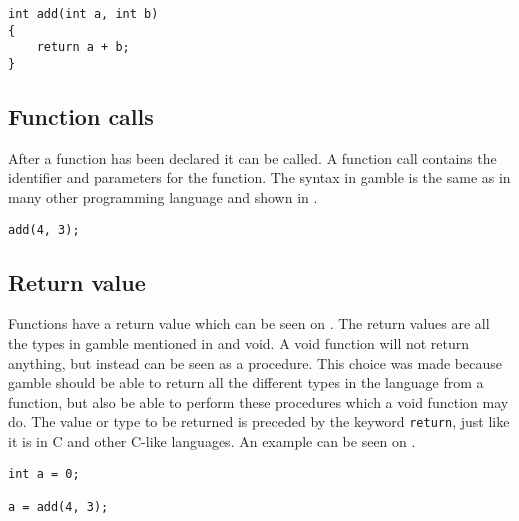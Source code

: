 \begin{lstlisting}[caption={Function Identifier},label={lst:functionID},numbers=none]                                                        
int add(int a, int b)
{
    return a + b;
}
\end{lstlisting}

\subsection*{Function calls}
After a function has been declared it can be called. 
A function call contains the identifier and parameters for the function. 
The syntax in \gls{gamble} is the same as in many other programming language and shown in . 

\begin{lstlisting}[caption={A function call in \gls{gamble}},label={lst:functionCall},numbers=none]
add(4, 3);
\end{lstlisting}


\subsection*{Return value}
Functions have a return value which can be seen on .
The return values are all the types in \gls{gamble} mentioned in  and void. 
A void function will not return anything, but instead can be seen as a procedure.
This choice was made because \gls{gamble} should be able to return all the different types in the language from a function, but also be able to perform these procedures which a void function may do.
The value or type to be returned is preceded by the keyword \texttt{return}, just like it is in C and other C-like languages.
An example can be seen on .

\begin{lstlisting}[caption={Return Function},label={lst:returnFunction}]
int a = 0;

a = add(4, 3);
\end{lstlisting}


 

